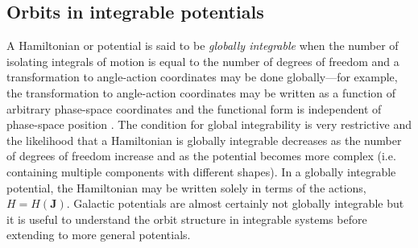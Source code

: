 \subsection{Orbits in integrable potentials}

A Hamiltonian or potential is said to be \emph{globally integrable} when the
number of isolating integrals of motion is equal to the number of degrees of
freedom and a transformation to angle-action coordinates may be done
globally---for example, the transformation to angle-action coordinates may be
written as a function of arbitrary phase-space coordinates and the functional
form is independent of phase-space position \citep[e.g.,][]{goldstein80}. The
condition for global integrability is very restrictive and the likelihood that a
Hamiltonian is globally integrable decreases as the number of degrees of freedom
increase \citep[e.g.,][]{lichtenberg83} and as the potential becomes more
complex (i.e. containing multiple components with different shapes). In a
globally integrable potential, the Hamiltonian may be written solely in terms of
the actions, $H = H(\boldsymbol{J})$. Galactic potentials are almost certainly
not globally integrable but it is useful to understand the orbit structure in
integrable systems before extending to more general potentials. 

